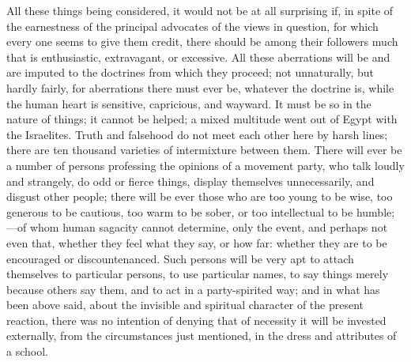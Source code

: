 All these things being considered, it would not
be at all surprising if, in spite of the earnestness of the principal
advocates of the views in question, for which every one seems to give
them credit, there should be among their followers much that is
enthusiastic, extravagant, or excessive. All these aberrations will be
and are imputed to the doctrines from which they proceed; not
unnaturally, but hardly fairly, for aberrations there must ever be,
whatever the doctrine is, while the human heart is sensitive,
capricious, and wayward. It must be so in the nature of things; it
cannot be helped; a mixed multitude went out of Egypt with the
Israelites. Truth and falsehood do not meet each other here by harsh
lines; there are ten thousand varieties of intermixture between them.
There will ever be a number of persons professing the opinions of a
movement party, who talk loudly and strangely, do odd or fierce
things, display themselves unnecessarily, and disgust other people;
there will be ever those who are too young to be wise, too generous to
be cautious, too warm to be sober, or too intellectual to be
humble;—of whom human sagacity cannot determine, only the event, and
perhaps not even that, whether they feel what they say, or how far:
whether they are to be encouraged or discountenanced. Such persons
will be very apt to attach themselves to particular persons, to use
particular names, to say things merely because others say them, and to
act in a party-spirited way; and in what has been above said, about
the invisible and spiritual character of the present reaction,
there was no intention of denying that of necessity it will be
invested externally, from the circumstances just mentioned, in the
dress and attributes of a school.

